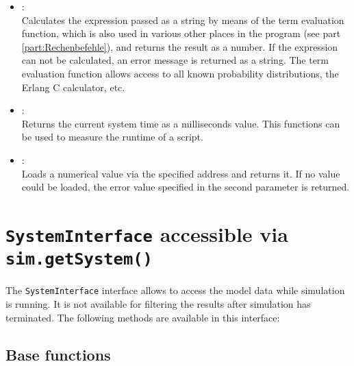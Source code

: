 \begin{itemize}

\item
{}:\\
Calculates the expression passed as a string by means of the term evaluation function,
which is also used in various other places in the program (see part \ref{part:Rechenbefehle}), and returns the result as a  number.
If the expression can not be calculated, an error message is returned as a string.
The term evaluation function allows access to all known probability distributions,
the Erlang C calculator, etc.

\item
{}:\\
Returns the current system time as a milliseconds value. This functions can be used to measure
the runtime of a script.

\item
{}:\\
Loads a numerical value via the specified address and returns it.
If no value could be loaded, the error value specified in the second parameter is returned.

\end{itemize}



\chapter{\texttt{SystemInterface} accessible via \texttt{sim.getSystem()}}

The \texttt{SystemInterface} interface allows to access the model data while simulation is running.
It is not available for filtering the results after simulation has terminated.
The following methods are available in this interface:

\section{Base functions}

